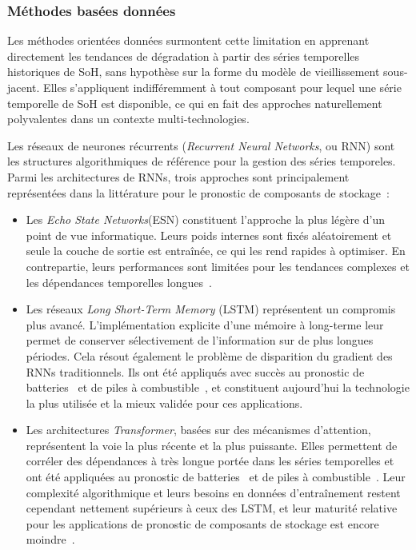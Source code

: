 \subsubsection{Méthodes basées données}

Les méthodes orientées données surmontent cette limitation en apprenant directement les tendances de dégradation à partir des séries temporelles historiques de SoH, sans hypothèse sur la forme du modèle de vieillissement sous-jacent. Elles s'appliquent indifféremment à tout composant pour lequel une série temporelle de SoH est disponible, ce qui en fait des approches naturellement polyvalentes dans un contexte multi-technologies.

Les réseaux de neurones récurrents (\textit{Recurrent Neural Networks}, ou RNN) sont les structures algorithmiques de référence pour la gestion des séries temporeles. Parmi les architectures de RNNs, trois approches sont principalement représentées dans la littérature pour le pronostic de composants de stockage~:

\begin{itemize}
    \item Les \textit{Echo State Networks}(ESN) constituent l'approche la plus légère d'un point de vue informatique. Leurs poids internes sont fixés aléatoirement et seule la couche de sortie est entraînée, ce qui les rend rapides à optimiser. En contrepartie, leurs performances sont limitées pour les tendances complexes et les dépendances temporelles longues~\cite{catelani_remaining_2021}\cite{yue_degradation_2022}.

    \item Les réseaux \textit{Long Short-Term Memory} (LSTM) représentent un compromis plus avancé. L'implémentation explicite d'une mémoire à long-terme leur permet de conserver sélectivement de l'information sur de plus longues périodes. Cela résout également le problème de disparition du gradient des RNNs traditionnels. Ils ont été appliqués avec succès au pronostic de batteries~\cite{zhang_accurate_2023} et de piles à combustible~\cite{wang_novel_2022}, et constituent aujourd'hui la technologie la plus utilisée et la mieux validée pour ces applications.

    \item Les architectures \textit{Transformer}, basées sur des mécanismes d'attention, représentent la voie la plus récente et la plus puissante. Elles permettent de corréler des dépendances à très longue portée dans les séries temporelles et ont été appliquées au pronostic de batteries~\cite{chen_transformer_2022} et de piles à combustible~\cite{lv_transformer_2024}. Leur complexité algorithmique et leurs besoins en données d'entraînement restent cependant nettement supérieurs à ceux des LSTM, et leur maturité relative pour les applications de pronostic de composants de stockage est encore moindre~\cite{chandra_evaluation_2021}\cite{hewamalage_recurrent_2021}.
\end{itemize}

